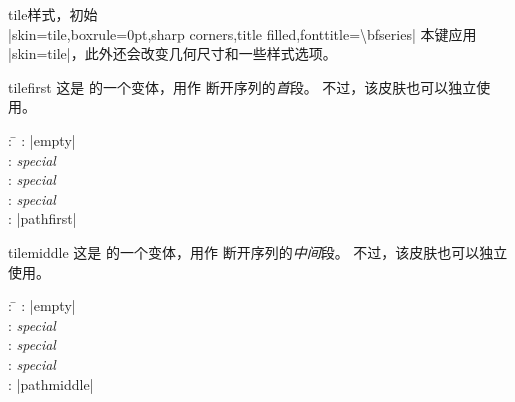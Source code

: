 \begin{docTcbKey}[][doc new=2016-02-25]{tile}{}{样式，初始\\
  |skin=tile,boxrule=0pt,sharp corners,title filled,fonttitle=\textbackslash bfseries|
}
  本键应用 |skin=tile|，此外还会改变几何尺寸和一些样式选项。
\end{docTcbKey}


\begin{dispExample}
\end{dispExample}


\clearpage
\begin{docSkin}[doc new=2016-02-25]{tilefirst}
这是  的一个变体，用作  断开序列的\emph{首}段。
不过，该皮肤也可以独立使用。
\begin{tcolorbox}[skintable=tilefirst]
  \begin{tabbing}
    : \=\kill
    :           \> |empty|\\
    : \> \emph{special}\\ 
    :        \> \emph{special}\\
    :    \> \emph{special}\\
    :           \> |pathfirst|
  \end{tabbing}
\end{tcolorbox}
\end{docSkin}

\begin{dispExample}
\end{dispExample}


\clearpage
\begin{docSkin}[doc new=2016-02-25]{tilemiddle}
这是  的一个变体，用作  断开序列的\emph{中间}段。
不过，该皮肤也可以独立使用。
\begin{tcolorbox}[skintable=tilemiddle]
  \begin{tabbing}
    : \=\kill
    :           \> |empty|\\
    : \> \emph{special}\\ 
    :        \> \emph{special}\\
    :    \> \emph{special}\\
    :           \> |pathmiddle|
  \end{tabbing}
\end{tcolorbox}
\end{docSkin}


